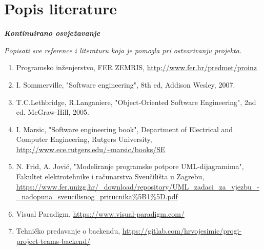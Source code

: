 \chapter*{Popis literature}
	 	
 		\textbf{\textit{Kontinuirano osvježavanje}}
	
		\textit{Popisati sve reference i literaturu koja je pomogla pri ostvarivanju projekta.}
		
		
		\begin{enumerate}
			
			
			\item  Programsko inženjerstvo, FER ZEMRIS, \url{http://www.fer.hr/predmet/proinz}
			
			\item  I. Sommerville, "Software engineering", 8th ed, Addison Wesley, 2007.
			
			\item  T.C.Lethbridge, R.Langaniere, "Object-Oriented Software Engineering", 2nd ed. McGraw-Hill, 2005.
			
			\item  I. Marsic, "Software engineering book", Department of Electrical and Computer Engineering, Rutgers University, \url{http://www.ece.rutgers.edu/~marsic/books/SE}

			\item  N. Frid, A. Jović, "Modeliranje programske potpore UML-dijagramima", Fakultet elektrotehnike i računarstva Sveučilišta u Zagrebu, \url{https://www.fer.unizg.hr/_download/repository/UML_zadaci_za_vjezbu_-_nadopuna_sveucilisnog_prirucnika%5B1%5D.pdf}

			\item  Visual Paradigm, \url{https://www.visual-paradigm.com/}
			
			\item  Tehničko predavanje o backendu, \url{https://gitlab.com/hrvojesimic/progi-project-teams-backend/}

		\end{enumerate}
		
		 